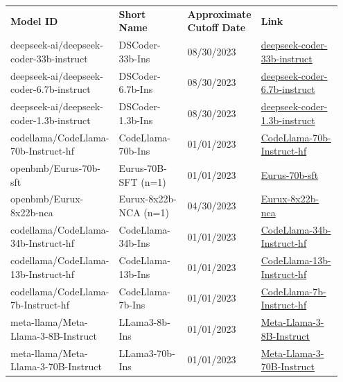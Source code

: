 \begin{longtable}{|p{0.3\linewidth}|p{0.22\linewidth}|p{0.15\linewidth}|p{0.28\linewidth}|}
    \textbf{Model ID} & \textbf{Short Name} & \textbf{Approximate Cutoff Date} & \textbf{Link} \\
deepseek-ai/deepseek-coder-33b-instruct & DSCoder-33b-Ins & 08/30/2023 & \href{https://huggingface.co/deepseek-ai/deepseek-coder-33b-instruct}{deepseek-coder-33b-instruct} \\ 
deepseek-ai/deepseek-coder-6.7b-instruct & DSCoder-6.7b-Ins & 08/30/2023 & \href{https://huggingface.co/deepseek-ai/deepseek-coder-6.7b-instruct}{deepseek-coder-6.7b-instruct} \\ 
deepseek-ai/deepseek-coder-1.3b-instruct & DSCoder-1.3b-Ins & 08/30/2023 & \href{https://huggingface.co/deepseek-ai/deepseek-coder-1.3b-instruct}{deepseek-coder-1.3b-instruct} \\ 
codellama/CodeLlama-70b-Instruct-hf & CodeLlama-70b-Ins & 01/01/2023 & \href{https://huggingface.co/codellama/CodeLlama-70b-Instruct-hf}{CodeLlama-70b-Instruct-hf} \\ 
openbmb/Eurus-70b-sft & Eurus-70B-SFT (n=1) & 01/01/2023 & \href{https://huggingface.co/openbmb/Eurus-70b-sft}{Eurus-70b-sft} \\ 
openbmb/Eurux-8x22b-nca & Eurux-8x22b-NCA (n=1) & 04/30/2023 & \href{https://huggingface.co/openbmb/Eurux-8x22b-nca}{Eurux-8x22b-nca} \\ 
codellama/CodeLlama-34b-Instruct-hf & CodeLlama-34b-Ins & 01/01/2023 & \href{https://huggingface.co/codellama/CodeLlama-34b-Instruct-hf}{CodeLlama-34b-Instruct-hf} \\ 
codellama/CodeLlama-13b-Instruct-hf & CodeLlama-13b-Ins & 01/01/2023 & \href{https://huggingface.co/codellama/CodeLlama-13b-Instruct-hf}{CodeLlama-13b-Instruct-hf} \\ 
codellama/CodeLlama-7b-Instruct-hf & CodeLlama-7b-Ins & 01/01/2023 & \href{https://huggingface.co/codellama/CodeLlama-7b-Instruct-hf}{CodeLlama-7b-Instruct-hf} \\ 
meta-llama/Meta-Llama-3-8B-Instruct & LLama3-8b-Ins & 01/01/2023 & \href{https://huggingface.co/meta-llama/Meta-Llama-3-8B-Instruct}{Meta-Llama-3-8B-Instruct} \\ 
meta-llama/Meta-Llama-3-70B-Instruct & LLama3-70b-Ins & 01/01/2023 & \href{https://huggingface.co/meta-llama/Meta-Llama-3-70B-Instruct}{Meta-Llama-3-70B-Instruct} \\ 

\end{longtable}
